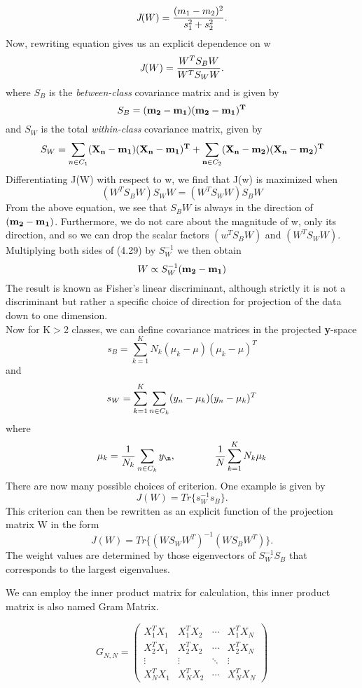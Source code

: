 \documentclass[12pt, letterpaper]{article}
\begin{document}
\[\emph{J}(W) = \frac{(m_1 - m_2)^2}{s_1^2 + s_2^2}.\]
Now, rewriting equation gives us an explicit dependence on w
\[\emph{J}(W) = \frac{W^TS_BW}{W^TS_WW}.\]
where \(S_B\) is the \textit{between-class} covariance matrix and is given by
\[S_B =(\bf{m_2 -m_1})(\bf{m_2 -m_1})^T\]
and \(S_W\) is the total \textit{within-class} covariance matrix, given by
\[S_W = \sum_{n \in \emph{\(C_1\)}}(\bf{X_n - m_1})(\bf{X_n - m_1})^T + \sum_{n \in \emph{\(C_2\)}}(\bf{X_n - m_2})(\bf{X_n - m_2})^T \]
Differentiating J(W) with respect to w, we find that J(w) is maximized when
\[(W^TS_BW)S_WW = (W^TS_WW)S_BW\]
From the above equation, we see that \(S_BW\) is always in the direction of \((\bf{m_2 - m_1} )\). Furthermore,
we do not care about the magnitude of w, only its direction, and so we can drop the scalar factors \((w^TS_BW)\) and \((W^TS_WW)\).\\
Multiplying both sides of (4.29) by \(S_W^{-1}\) we then obtain
\[W \propto S_W^{-1}(\bf{m_2 - m_1}) \]
The result is known as Fisher’s linear discriminant, although strictly it
is not a discriminant but rather a specific choice of direction for projection of the
data down to one dimension.\\

Now for K\(>\)2 classes, we can define covariance matrices in the projected \textbf{y}-space
\[s_B = \sum_{k=1}^{K}N_k( \mu_k - \mu)(\mu_k - \mu)^T\]
and
\[s_W = \sum_{k=1}^{K}\sum_{n \in \emph{\(C_k\)}}( y_n - \mu_k)(y_n - 	\mu_k)^T \]
where
\[ \mu_k = \frac{1}{N_k} \sum_{n \in C_k}y_\n, \qquad \qquad \frac{1}{N}\sum_{k=1}^{K}N_k\mu_k \]
There are now many possible choices of criterion. One example is given by
\[J(W) = Tr\{s_W^{-1}s_B\}.\]
This criterion can then be rewritten as an explicit function of the projection matrix
W in the form
\[J(W) = Tr\{(WS_WW^T)^{-1}(WS_BW^T)\}.\]
The weight values are determined by those eigenvectors of \(S_W^{-1}S_B\) that corresponds to the largest eigenvalues.

We can employ the inner product matrix for calculation, this inner product matrix is also named Gram Matrix.

\[G_{N,N} = 
 \begin{pmatrix}
X_1^TX_1 & X_1^TX_2 & \cdots & X_1^TX_N \\
X_2^TX_1 & X_2^TX_2 & \cdots & X_2^TX_N \\
\vdots & \vdots & \ddots & \vdots\\
X_N^TX_1 & X_N^TX_2 & \cdots & X_N^TX_N
\end{pmatrix} \]
\end{document}
